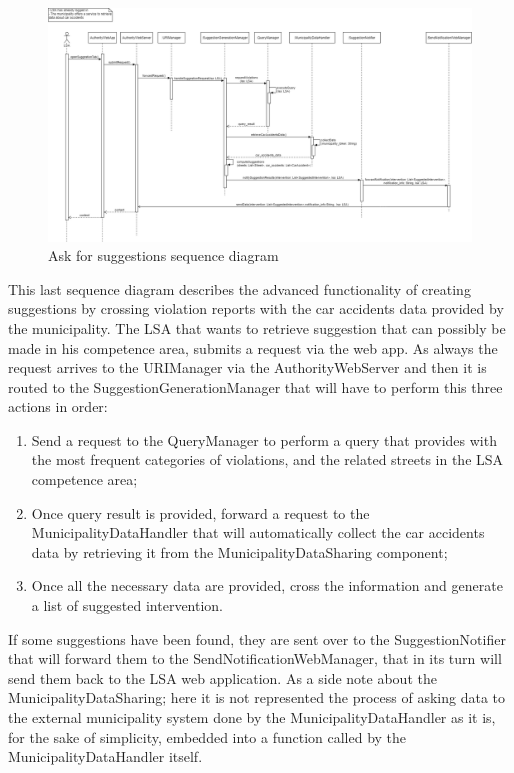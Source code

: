 \begin{figure}[H]
  \centering
  \includegraphics[width=1\textwidth]{Images/UML_diagrams/Sequence_Diagrams/Ask_for_suggestions_sd.png}
  \caption{Ask for suggestions sequence diagram}
  \label{fig:ask_suggestions_sd}
\end{figure}
This last sequence diagram describes the advanced functionality of creating suggestions by crossing violation reports with the car accidents data provided by the municipality. The LSA that wants to retrieve suggestion that can possibly be made in his competence area, submits a request via the web app. As always the request arrives to the URIManager via the AuthorityWebServer and then it is routed to the SuggestionGenerationManager that will have to perform this three actions in order:
\begin{enumerate}
  \item Send a request to the QueryManager to perform a query that provides with the most frequent categories of violations, and the related streets in the LSA competence area;
  \item Once query result is provided, forward a request to the MunicipalityDataHandler that will automatically collect the car accidents data by retrieving it from the MunicipalityDataSharing component;
  \item Once all the necessary data are provided, cross the information and generate a list of suggested intervention. 
\end{enumerate}

If some suggestions have been found, they are sent over to the SuggestionNotifier that will forward them to the SendNotificationWebManager, that in its turn will send them back to the LSA web application. As a side note about the MunicipalityDataSharing; here it is not represented the process of asking data to the external municipality system done by the MunicipalityDataHandler as it is, for the sake of simplicity, embedded into a function called by the MunicipalityDataHandler itself. 
